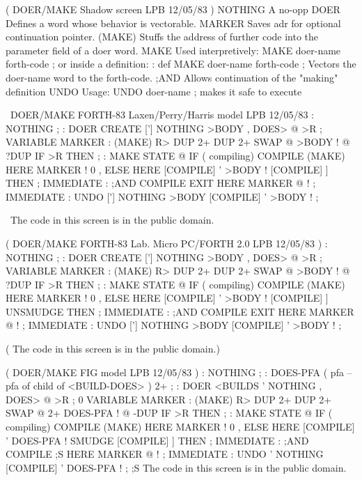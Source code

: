 \vfill
\setcounter{screen}{21}
\begin{Screen}
( DOER/MAKE   Shadow screen                      LPB 12/05/83 )
NOTHING   A no-opp
DOER      Defines a word whose behavior is vectorable.
MARKER    Saves adr for optional continuation pointer.
(MAKE)    Stuffs the address of further code into the
          parameter field of a doer word.
MAKE      Used interpretively:  MAKE doer-name  forth-code ;
          or inside a definition:
             : def   MAKE doer-name  forth-code ;
          Vectors the doer-name word to the forth-code.
;AND      Allows continuation of the "making" definition
UNDO      Usage:  UNDO doer-name ; makes it safe to execute




\end{Screen}
\vfill
\begin{Screen}
\ DOER/MAKE   FORTH-83 Laxen/Perry/Harris model  LPB 12/05/83 
: NOTHING ;
: DOER   CREATE  ['] NOTHING  >BODY ,  DOES> @ >R ;
VARIABLE MARKER
: (MAKE)  R>  DUP 2+  DUP 2+  SWAP @  >BODY !
   @ ?DUP IF >R THEN ;
: MAKE   STATE @ IF ( compiling)
   COMPILE (MAKE)  HERE MARKER !  0 ,
   ELSE  HERE  [COMPILE] '  >BODY !
   [COMPILE] ]  THEN ;   IMMEDIATE
: ;AND   COMPILE EXIT  HERE MARKER @ ! ;   IMMEDIATE
: UNDO   ['] NOTHING  >BODY  [COMPILE] '  >BODY ! ;

\ The code in this screen is in the public domain.


\end{Screen}
\vfill
\begin{Screen}
( DOER/MAKE   FORTH-83 Lab. Micro PC/FORTH 2.0   LPB 12/05/83 )
: NOTHING ;
: DOER   CREATE  ['] NOTHING  >BODY ,  DOES> @ >R ;
VARIABLE MARKER
: (MAKE)  R>  DUP 2+  DUP 2+  SWAP @  >BODY !
   @ ?DUP IF >R THEN ;
: MAKE   STATE @ IF ( compiling)
   COMPILE (MAKE)  HERE MARKER !  0 ,
   ELSE  HERE  [COMPILE] '  >BODY !
   [COMPILE] ] UNSMUDGE  THEN ;   IMMEDIATE
: ;AND   COMPILE EXIT  HERE MARKER @ ! ;   IMMEDIATE
: UNDO   ['] NOTHING  >BODY  [COMPILE] '  >BODY ! ;

( The code in this screen is in the public domain.)


\end{Screen}
\vfill
\begin{Screen}
( DOER/MAKE   FIG model                          LPB 12/05/83 )
: NOTHING   ;
: DOES-PFA  ( pfa -- pfa of child of <BUILD-DOES> )   2+ ;
: DOER   <BUILDS  ' NOTHING ,  DOES> @ >R ;
0 VARIABLE MARKER
: (MAKE)  R>  DUP 2+  DUP 2+  SWAP @  2+ DOES-PFA !
   @ -DUP IF >R THEN ;
: MAKE  STATE @ IF ( compiling)
   COMPILE (MAKE)  HERE MARKER !  0 ,
   ELSE  HERE  [COMPILE] '  DOES-PFA !
   SMUDGE    [COMPILE] ] THEN ; IMMEDIATE
: ;AND   COMPILE ;S  HERE MARKER @ ! ;  IMMEDIATE
: UNDO   ' NOTHING  [COMPILE] '  DOES-PFA ! ;
;S
The code in this screen is in the public domain.

\end{Screen}
